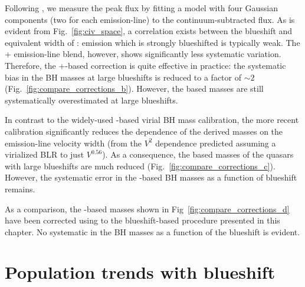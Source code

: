 Following \citet{runnoe13}, we measure the peak flux by fitting a model with four Gaussian components (two for each emission-line) to the continuum-subtracted flux.
As is evident from Fig.~\ref{fig:civ_space}, a correlation exists between the blueshift and equivalent width of :  emission which is strongly blueshifted is typically weak. 
The + emission-line blend, however, shows significantly less systematic variation. 
Therefore, the +-based correction is quite effective in practice: the systematic bias in the  BH masses at large  blueshifts is reduced to a factor of $\sim2$ (Fig.~\ref{fig:compare_corrections_b}).
However, the  based masses are still systematically overestimated at large  blueshifts. 

In contrast to the widely-used \citet{vestergaard06} -based virial BH mass calibration, the more recent \citet{park13} calibration significantly reduces the dependence of the derived masses on the emission-line velocity width (from the $V^2$ dependence predicted assuming a virialized BLR to just $V^{0.56}$).
As a consequence, the  based masses of the quasars with large  blueshifts are much reduced (Fig.~\ref{fig:compare_corrections_c}).
However, the systematic error in the -based BH masses as a function of  blueshift remains. 

As a comparison, the -based masses shown in Fig~\ref{fig:compare_corrections_d} have been corrected using to the  blueshift-based procedure presented in this chapter. 
No systematic in the BH masses as a function of the  blueshift is evident. 

\section{Population trends with  blueshift}
\label{sec:hatrends}

